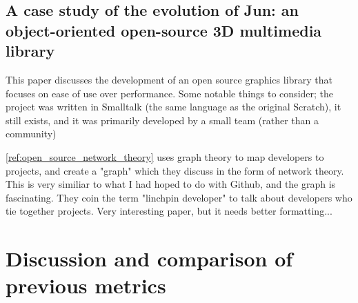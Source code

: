 \documentclass[]{article}
\begin{document}



\subsection{A case study of the evolution of Jun: an object-oriented open-source 3D multimedia library}

This paper discusses the development of an open source graphics library that focuses on ease of use over performance.
Some notable things to consider; the project was written in Smalltalk (the same language as the original Scratch), it still exists, and it was primarily developed by a small team (rather than a community)


\ref{ref:open_source_network_theory} uses graph theory to map developers to projects, and create a "graph" which they discuss in the form of network theory.
This is very similiar to what I had hoped to do with Github, and the graph is fascinating.
They coin the term "linchpin developer" to talk about developers who tie together projects.
Very interesting paper, but it needs better formatting...






\section{Discussion and comparison of previous metrics}
\end{document}
